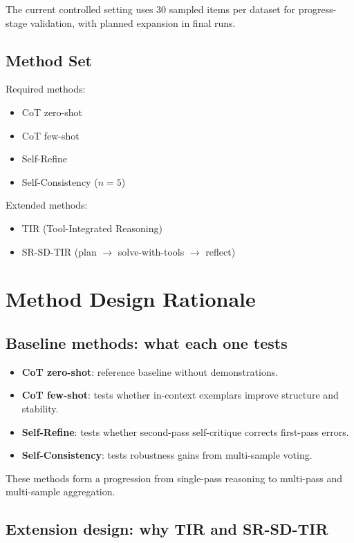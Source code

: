 \documentclass[11pt]{article}
\begin{document}
The current controlled setting uses 30 sampled items per dataset for progress-stage validation, with planned expansion in final runs.

\subsection{Method Set}

Required methods:
\begin{itemize}[leftmargin=*]
    \item CoT zero-shot
    \item CoT few-shot
    \item Self-Refine
    \item Self-Consistency ($n = 5$)
\end{itemize}

Extended methods:
\begin{itemize}[leftmargin=*]
    \item TIR (Tool-Integrated Reasoning)
    \item SR-SD-TIR (plan $\rightarrow$ solve-with-tools $\rightarrow$ reflect)
\end{itemize}

\section{Method Design Rationale}

\subsection{Baseline methods: what each one tests}

\begin{itemize}[leftmargin=*]
    \item \textbf{CoT zero-shot}: reference baseline without demonstrations.
    \item \textbf{CoT few-shot}: tests whether in-context exemplars improve structure and stability.
    \item \textbf{Self-Refine}: tests whether second-pass self-critique corrects first-pass errors.
    \item \textbf{Self-Consistency}: tests robustness gains from multi-sample voting.
\end{itemize}

These methods form a progression from single-pass reasoning to multi-pass and multi-sample aggregation.

\subsection{Extension design: why TIR and SR-SD-TIR}
\end{document}
